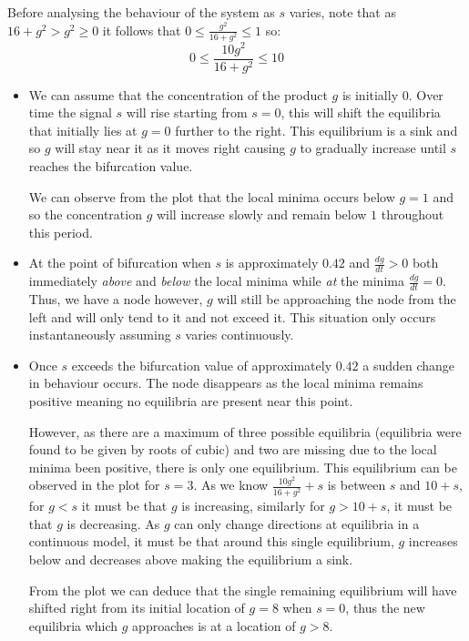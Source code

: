 \documentclass[a4paper, 11pt]{article}
\begin{document}
\begin{enumerate}[label=(\alph*)]
  Before analysing the behaviour of the system as $s$ varies, note that as $16+g^2>g^2\geq0$ it follows that $0\leq\frac{g^2}{16+g^2}\leq1$ so:
  $$0\leq \frac{10g^2}{16+g^2}\leq 10$$

\begin{itemize}
  \item   We can assume that the concentration of the product $g$ is initially $0$. Over time the signal $s$ will rise starting from $s=0$, this will shift the equilibria that initially lies at $g=0$ further to the right. This equilibrium is a sink and so $g$ will stay near it as it moves right causing $g$ to gradually increase until $s$ reaches the bifurcation value.
  
  We can observe from the plot that the local minima occurs below $g=1$ and so the concentration $g$ will increase slowly and remain below $1$ throughout this period.  
  
  \item At the point of bifurcation when $s$ is approximately $0.42$ and $\frac{dg}{dt}>0$ both immediately \textit{above} and \textit{below} the local minima while \textit{at} the minima $\frac{dg}{dt}=0$. Thus, we have a node however, $g$ will still be approaching the node from the left and will only tend to it and not exceed it. This situation only occurs instantaneously assuming $s$ varies continuously. 

  \item Once $s$ exceeds the bifurcation value of approximately $0.42$ a sudden change in behaviour occurs. The node disappears as the local minima remains positive meaning no equilibria are present near this point. 
  
  However, as there are a maximum of three possible equilibria (equilibria were found to be given by roots of cubic) and two are missing due to the local minima been positive, there is only one equilibrium. This equilibrium can be observed in the plot for $s=3$. As we know $\frac{10g^2}{16+g^2}+s$ is between $s$ and $10+s$, for $g<s$ it must be that $g$ is increasing, similarly for $g>10+s$, it must be that $g$ is decreasing. As $g$ can only change directions at equilibria in a continuous model, it must be that around this single equilibrium, $g$ increases below and decreases above making the equilibrium a sink. 
  
  From the plot we can deduce that the single remaining equilibrium will have shifted right from its initial location of $g=8$ when $s=0$, thus the new equilibria which $g$ approaches is at a location of $g>8$. 
  

\end{itemize}
\end{enumerate}
\end{document}
